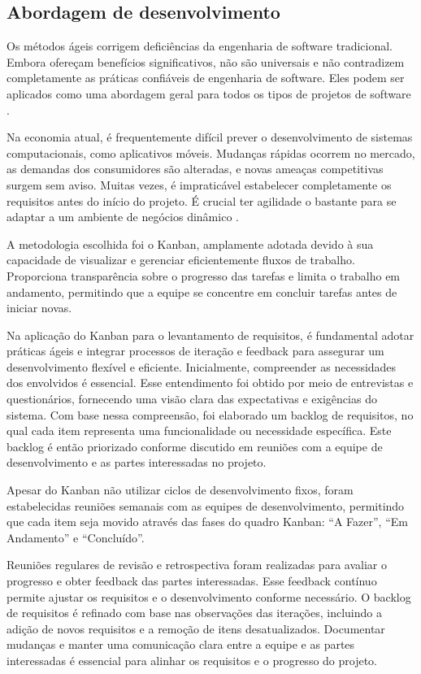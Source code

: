 
\subsection{Abordagem de desenvolvimento}

Os métodos ágeis corrigem deficiências da engenharia de software tradicional.
Embora ofereçam benefícios significativos, não são universais e não contradizem completamente as práticas confiáveis de engenharia de software. Eles podem ser aplicados como uma abordagem geral para todos os tipos de projetos de software \cite{pressman}.

Na economia atual, é frequentemente difícil prever o desenvolvimento de sistemas computacionais, como aplicativos móveis. Mudanças rápidas ocorrem no mercado, as demandas dos consumidores são alteradas, e novas ameaças competitivas surgem sem aviso. Muitas vezes, é impraticável estabelecer completamente os requisitos antes do início do projeto. É crucial ter agilidade o bastante para se adaptar a um ambiente de negócios dinâmico \cite{pressman}.

A metodologia escolhida foi o Kanban, amplamente adotada devido à sua capacidade de visualizar e gerenciar eficientemente fluxos de trabalho. Proporciona transparência sobre o progresso das tarefas e limita o trabalho em andamento, permitindo que a equipe se concentre em concluir tarefas antes de iniciar novas.

Na aplicação do Kanban para o levantamento de requisitos, é fundamental adotar práticas ágeis e integrar processos de iteração e feedback para assegurar um desenvolvimento flexível e eficiente. Inicialmente, compreender as necessidades dos envolvidos é essencial. Esse entendimento foi obtido por meio de entrevistas e questionários, fornecendo uma visão clara das expectativas e exigências do sistema. Com base nessa compreensão, foi elaborado um backlog de requisitos, no qual cada item representa uma funcionalidade ou necessidade específica. Este backlog é então priorizado conforme discutido em reuniões com a equipe de desenvolvimento e as partes interessadas no projeto.

Apesar do Kanban não utilizar ciclos de desenvolvimento fixos, foram estabelecidas reuniões semanais com as equipes de desenvolvimento, permitindo que cada item seja movido através das fases do quadro Kanban: “A Fazer”, “Em Andamento” e “Concluído”.

Reuniões regulares de revisão e retrospectiva foram realizadas para avaliar o progresso e obter feedback das partes interessadas. Esse feedback contínuo permite ajustar os requisitos e o desenvolvimento conforme necessário. O backlog de requisitos é refinado com base nas observações das iterações, incluindo a adição de novos requisitos e a remoção de itens desatualizados. Documentar mudanças e manter uma comunicação clara entre a equipe e as partes interessadas é essencial para alinhar os requisitos e o progresso do projeto.


